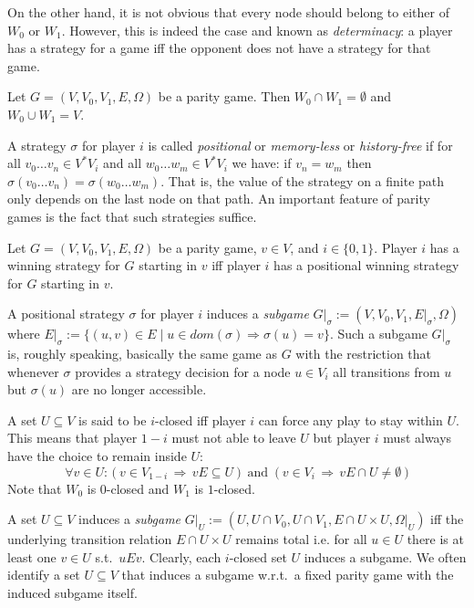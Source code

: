 On the other hand, it is not obvious that every node should belong to either of $W_0$ or $W_1$. However, this
is indeed the case and known as \emph{determinacy}: a player has a strategy for a game iff the opponent does
not have a strategy for that game.

\begin{theorem}
Let $G = (V,V_0,V_1,E,\Omega)$ be a parity game. Then $W_0 \cap W_1 = \emptyset$ and $W_0 \cup W_1 = V$.
\end{theorem}

A strategy $\sigma$ for player $i$ is called \emph{positional} or \emph{memory-less} or \emph{history-free} if
for all $v_0\ldots v_n \in V^*V_i$ and all $w_0\ldots w_m \in V^*V_i$ we have: if $v_n = w_m$ then
$\sigma(v_0\ldots v_n) = \sigma(w_0\ldots w_m)$. That is, the value of the strategy on a finite path
only depends on the last node on that path. An important feature of parity games is the fact that such
strategies suffice.

\begin{theorem}
Let $G = (V,V_0,V_1,E,\Omega)$ be a parity game, $v \in V$, and $i \in \{0,1\}$. Player $i$ has a winning
strategy for $G$ starting in $v$ iff player $i$ has a positional winning strategy for $G$ starting in $v$.
\end{theorem}

A positional strategy $\sigma$ for player $i$ induces a \emph{subgame} 
$G|_\sigma := (V, V_0, V_1, E|_\sigma, \Omega)$ where 
$E|_\sigma := \{(u, v) \in E \mid u \in dom(\sigma) \Rightarrow \sigma(u) = v\}$. Such a subgame $G|_\sigma$ 
is, roughly speaking, basically the same game as $G$ with the restriction that whenever $\sigma$ provides a 
strategy decision for a node $u \in V_i$ all transitions from $u$ but $\sigma(u)$ are no longer accessible.

A set $U \subseteq V$ is said to be $i$-closed iff player $i$ can force any play to stay within $U$. This
means that player $1-i$ must not able to leave $U$ but player $i$ must always have the choice to remain 
inside $U$: 
\begin{displaymath}
\forall v \in U:\, \big(\ v \in V_{1-i}\, \Rightarrow \, vE \subseteq U\ \big)
\enspace \mbox{and} \enspace
\big(\ v \in V_i\, \Rightarrow \, vE \cap U \ne \emptyset\ \big)
\end{displaymath}
Note that $W_0$ is $0$-closed and $W_1$ is $1$-closed.

A set $U \subseteq V$ induces a \emph{subgame} 
$G|_U := (U, U \cap V_0, U \cap V_1, E \cap U \times U, \Omega|_U)$ iff the underlying transition relation 
$E \cap U \times U$ remains total i.e. for all $u \in U$ there is at least one $v \in U$ s.t.\ $uEv$. Clearly, 
each $i$-closed set $U$ induces a subgame. We often identify a set $U \subseteq V$ that induces a subgame 
w.r.t.\ a fixed parity game with the induced subgame itself.

